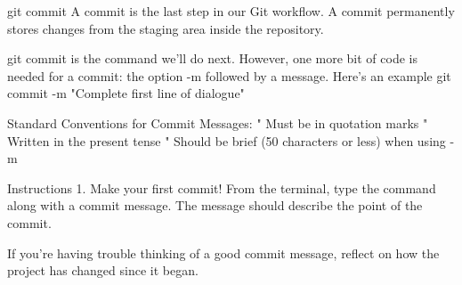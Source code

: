 git commit
    A commit is the last step in our Git workflow. A commit permanently stores changes from the staging area inside the repository.

    git commit is the command we’ll do next. However, one more bit of code is needed for a commit: the option -m followed by a message. Here’s an example
        git commit -m "Complete first line of dialogue"
    
    Standard Conventions for Commit Messages:
        " Must be in quotation marks
        " Written in the present tense
        " Should be brief (50 characters or less) when using -m
        
Instructions
    1.
    Make your first commit! From the terminal, type the command along with a commit message. The message should describe the point of the commit.

    If you’re having trouble thinking of a good commit message, reflect on how the project has changed since it began.  
